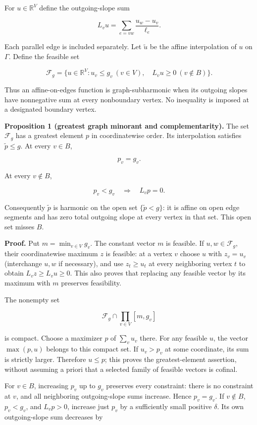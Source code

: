 \documentclass[
  11pt,
]{article}
\begin{document}
For \(u\in\mathbb R^V\) define the outgoing-slope sum

\[
L_vu=\sum_{e=vw}\frac{u_w-u_v}{\ell_e}.
\]

Each parallel edge is included separately. Let \(\widetilde u\) be the
affine interpolation of \(u\) on \(\Gamma\). Define the feasible set

\[
\mathcal F_g=\{u\in\mathbb R^V:u_v\leq g_v\ (v\in V),\quad L_vu\geq0\ (v\notin B)\}.
\]

Thus an affine-on-edges function is graph-subharmonic when its outgoing
slopes have nonnegative sum at every nonboundary vertex. No inequality
is imposed at a designated boundary vertex.

\textbf{Proposition 1 (greatest graph minorant and complementarity).}
The set \(\mathcal F_g\) has a greatest element \(p\) in coordinatewise
order. Its interpolation satisfies \(\widetilde p\leq g\). At every
\(v\in B\),

\[p_v=g_v.\]

At every \(v\notin B\),

\[p_v<g_v\quad\Longrightarrow\quad L_vp=0.\]

Consequently \(\widetilde p\) is harmonic on the open set
\(\{\widetilde p<g\}\): it is affine on open edge segments and has zero
total outgoing slope at every vertex in that set. This open set misses
\(B\).

\textbf{Proof.} Put \(m=\min_{v\in V}g_v\). The constant vector \(m\) is
feasible. If \(u,w\in\mathcal F_g\), their coordinatewise maximum \(z\)
is feasible: at a vertex \(v\) choose \(u\) with \(z_v=u_v\)
(interchange \(u,w\) if necessary), and use \(z_t\geq u_t\) at every
neighboring vertex \(t\) to obtain \(L_vz\geq L_vu\geq0\). This also
proves that replacing any feasible vector by its maximum with \(m\)
preserves feasibility.

The nonempty set

\[\mathcal F_g\cap\prod_{v\in V}[m,g_v]\]

is compact. Choose a maximizer \(p\) of \(\sum_vu_v\) there. For any
feasible \(u\), the vector \(\max(p,u)\) belongs to this compact set. If
\(u_v>p_v\) at some coordinate, its sum is strictly larger. Therefore
\(u\leq p\); this proves the greatest-element assertion, without
assuming a priori that a selected family of feasible vectors is cofinal.

For \(v\in B\), increasing \(p_v\) up to \(g_v\) preserves every
constraint: there is no constraint at \(v\), and all neighboring
outgoing-slope sums increase. Hence \(p_v=g_v\). If \(v\notin B\),
\(p_v<g_v\), and \(L_vp>0\), increase just \(p_v\) by a sufficiently
small positive \(\delta\). Its own outgoing-slope sum decreases by
\end{document}
